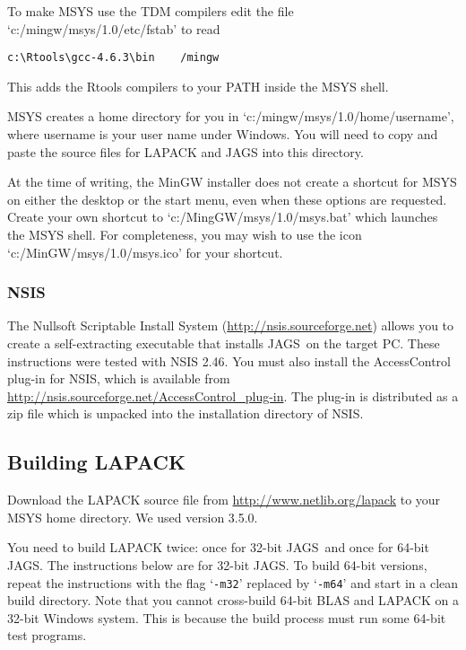 \documentclass[11pt, a4paper, titlepage]{article}
\newcommand{\JAGS}{\textsf{JAGS}}
\newcommand{\code}[1]{{\bgroup{\normalfont\ttfamily #1}\egroup}}
\newcommand{\samp}[1]{{`\bgroup\normalfont\texttt{#1}'\egroup}}
\newcommand{\file}[1]{{`\normalfont\textsf{#1}'}}
\let\option=\samp
\begin{document}
To make MSYS use the TDM compilers edit the file
\file{c:/mingw/msys/1.0/etc/fstab} to read
\begin{verbatim}
c:\Rtools\gcc-4.6.3\bin    /mingw
\end{verbatim}
This adds the Rtools compilers to your PATH inside the MSYS shell.

MSYS creates a home directory for you in
\file{c:/mingw/msys/1.0/home/username}, where \code{username} is your
user name under Windows. You will need to copy and paste the source
files for LAPACK and JAGS into this directory.

At the time of writing, the MinGW installer does not create a shortcut
for MSYS on either the desktop or the start menu, even when these
options are requested. Create your own shortcut to
\file{c:/MingGW/msys/1.0/msys.bat} which launches the MSYS shell. For
completeness, you may wish to use the icon
\file{c:/MinGW/msys/1.0/msys.ico} for your shortcut.

\subsubsection{NSIS}

The Nullsoft Scriptable Install System
(\url{http://nsis.sourceforge.net}) allows you to create a
self-extracting executable that installs \JAGS\ on the target PC.
These instructions were tested with NSIS 2.46.  You must also install
the AccessControl plug-in for NSIS, which is available from
\url{http://nsis.sourceforge.net/AccessControl_plug-in}. The plug-in
is distributed as a zip file which is unpacked into the installation
directory of NSIS.

\subsection{Building LAPACK}

Download the LAPACK source file from
\url{http://www.netlib.org/lapack} to your MSYS home directory. We
used version 3.5.0.

You need to build LAPACK twice: once for 32-bit \JAGS\ and once for
64-bit \JAGS. The instructions below are for 32-bit \JAGS. To build
64-bit versions, repeat the instructions with the flag \option{-m32}
replaced by \option{-m64} and start in a clean build directory.  Note
that you cannot cross-build 64-bit BLAS and LAPACK on a 32-bit Windows
system. This is because the build process must run some 64-bit test
programs.
\end{document}
